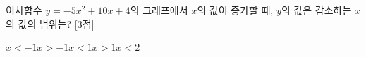 이차함수 $y=-5x^2+10x+4$의 그래프에서 $x$의 값이 증가할 때, $y$의 값은 감소하는 $x$의 값의 범위는? \mbox{[3점]}
\begin{choices32}{$x<-1$}{$x>-1$}{$x<1$}{$x>1$}{$x<2$}\end{choices32}
